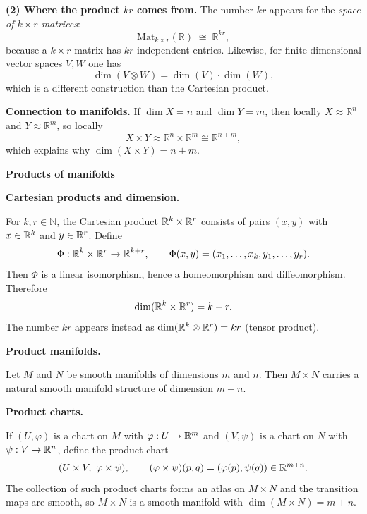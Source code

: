 \begin{solution}
\medskip
\noindent\textbf{(2) Where the product $kr$ comes from.}
The number $kr$ appears for the \emph{space of $k\times r$ matrices}:
\[
\mathrm{Mat}_{k\times r}(\mathbb{R}) \;\cong\; \mathbb{R}^{kr},
\]
because a $k\times r$ matrix has $kr$ independent entries.
Likewise, for finite-dimensional vector spaces $V,W$ one has
\[
\dim(V\otimes W)=\dim(V)\cdot\dim(W),
\]
which is a different construction than the Cartesian product.

\medskip
\noindent\textbf{Connection to manifolds.}
If $\dim X=n$ and $\dim Y=m$, then locally $X\approx\mathbb{R}^n$ and
$Y\approx\mathbb{R}^m$, so locally
\[
X\times Y \approx \mathbb{R}^n\times\mathbb{R}^m \cong \mathbb{R}^{n+m},
\]
which explains why $\dim(X\times Y)=n+m$.

\par\medskip\noindent\textbf{Products of manifolds}\par\smallskip


\par\medskip\noindent\textbf{Cartesian products and dimension.}\par\smallskip

For $k,r\in\mathbb N$, the Cartesian product $\mathbb{R}^k\times \mathbb{R}^r$ consists of pairs $(x,y)$
with $x\in\mathbb{R}^k$ and $y\in\mathbb{R}^r$. Define
\[
\Phi:\mathbb{R}^k\times\mathbb{R}^r \to \mathbb{R}^{k+r},\qquad
\Phi(x,y)=(x_1,\dots,x_k,y_1,\dots,y_r).
\]
Then $\Phi$ is a linear isomorphism, hence a homeomorphism and diffeomorphism.
Therefore
\[
\dim(\mathbb{R}^k\times\mathbb{R}^r)=k+r.
\]
The number $kr$ appears instead as $\dim(\mathbb{R}^k\otimes \mathbb{R}^r)=kr$ (tensor product).

\par\medskip\noindent\textbf{Product manifolds.}\par\smallskip

Let $M$ and $N$ be smooth manifolds of dimensions $m$ and $n$.
Then $M\times N$ carries a natural smooth manifold structure of dimension $m+n$.

\par\medskip\noindent\textbf{Product charts.}\par\smallskip

If $(U,\varphi)$ is a chart on $M$ with $\varphi:U\to \mathbb{R}^m$ and $(V,\psi)$ is a chart on $N$
with $\psi:V\to \mathbb{R}^n$, define the product chart
\[
(U\times V,\ \varphi\times\psi),\qquad
(\varphi\times\psi)(p,q)=(\varphi(p),\psi(q))\in \R^{m+n}.
\]
The collection of such product charts forms an atlas on $M\times N$ and the transition maps are smooth,
so $M\times N$ is a smooth manifold with $\dim(M\times N)=m+n$.


\end{solution}
